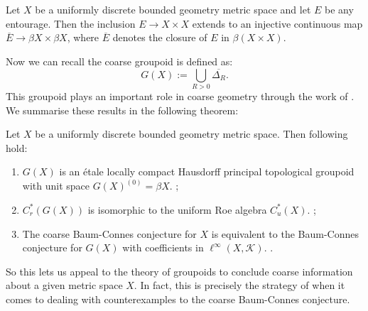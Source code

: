 \begin{conjecture}
{\begin{lemma}\label{Lem:CorRoe}
Let $X$ be a uniformly discrete bounded geometry metric space and let $E$ be any entourage. Then the inclusion $E \rightarrow X \times X$ extends to an injective continuous map $\overline{E} \rightarrow \beta X \times \beta X$, where $\overline{E}$ denotes the closure of $E$ in $\beta(X \times X)$.
\end{lemma}

Now we can recall the coarse groupoid is defined as:
\begin{equation*}
G(X):=\bigcup_{R>0}\overline{\Delta_{R}}.
\end{equation*}
This groupoid plays an important role in coarse geometry through the work of \cite{MR1905840}. We summarise these results in the following theorem:
\begin{theorem}
Let $X$ be a uniformly discrete bounded geometry metric space. Then following hold:
\begin{enumerate}
\item $G(X)$ is an \'etale locally compact Hausdorff principal topological groupoid with unit space $G(X)^{(0)}=\beta X$. \cite[Theorem 10.20]{MR2007488}\cite[Proposition 3.2]{MR1905840};
\item $C^{*}_{r}(G(X))$ is isomorphic to the uniform Roe algebra $C^{*}_{u}(X)$. \cite[Proposition 10.29]{MR2007488};
\item The coarse Baum-Connes conjecture for $X$ is equivalent to the Baum-Connes conjecture for $G(X)$ with coefficients in $\ell^{\infty}(X,\mathcal{K})$. \cite[Lemma 4.7]{MR1905840}.
\end{enumerate}
\end{theorem}

So this lets us appeal to the theory of groupoids to conclude coarse information about a given metric space $X$. In fact, this is precisely the strategy of \cite{MR1911663} when it comes to dealing with counterexamples to the coarse Baum-Connes conjecture.

}
\end{conjecture}
